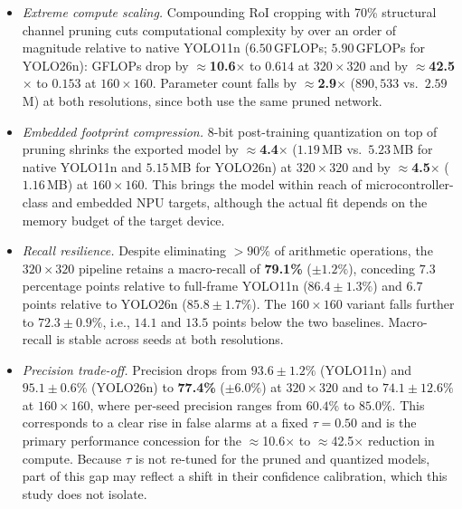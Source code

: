 \documentclass[conference]{IEEEtran}
\begin{document}
\begin{itemize}
    \item \emph{Extreme compute scaling.} Compounding RoI cropping with 70\% structural channel pruning cuts computational complexity by over an order of magnitude relative to native YOLO11n ($6.50$\,GFLOPs; $5.90$\,GFLOPs for YOLO26n): GFLOPs drop by $\approx$\textbf{10.6$\times$} to $0.614$ at $320\times 320$ and by $\approx$\textbf{42.5$\times$} to $0.153$ at $160\times 160$. Parameter count falls by $\approx$\textbf{2.9$\times$} ($890{,}533$ vs.\ $2.59$\,M) at both resolutions, since both use the same pruned network.
    
    \item \emph{Embedded footprint compression.} 8-bit post-training quantization on top of pruning shrinks the exported model by $\approx$\textbf{4.4$\times$} ($1.19$\,MB vs.\ $5.23$\,MB for native YOLO11n and $5.15$\,MB for YOLO26n) at $320\times 320$ and by $\approx$\textbf{4.5$\times$} ($1.16$\,MB) at $160\times 160$. This brings the model within reach of microcontroller-class and embedded NPU targets, although the actual fit depends on the memory budget of the target device.

    \item \emph{Recall resilience.} Despite eliminating $>90\%$ of arithmetic operations, the $320\times 320$ pipeline retains a macro-recall of \textbf{79.1\%} ($\pm 1.2\%$), conceding $7.3$ percentage points relative to full-frame YOLO11n ($86.4 \pm 1.3\%$) and $6.7$ points relative to YOLO26n ($85.8 \pm 1.7\%$). The $160\times 160$ variant falls further to $72.3 \pm 0.9\%$, i.e., $14.1$ and $13.5$ points below the two baselines. Macro-recall is stable across seeds at both resolutions.

    \item \emph{Precision trade-off.} Precision drops from $93.6 \pm 1.2\%$ (YOLO11n) and $95.1 \pm 0.6\%$ (YOLO26n) to \textbf{77.4\%} ($\pm 6.0\%$) at $320\times 320$ and to $74.1 \pm 12.6\%$ at $160\times 160$, where per-seed precision ranges from $60.4\%$ to $85.0\%$. This corresponds to a clear rise in false alarms at a fixed $\tau = 0.50$ and is the primary performance concession for the $\approx$10.6$\times$ to $\approx$42.5$\times$ reduction in compute. Because $\tau$ is not re-tuned for the pruned and quantized models, part of this gap may reflect a shift in their confidence calibration, which this study does not isolate.


\end{itemize}
\end{document}
